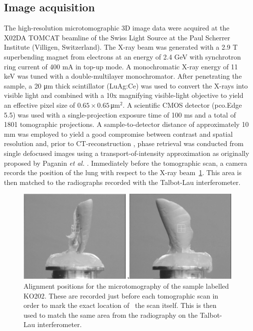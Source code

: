 \documentclass[preprint,12pt]{elsarticle}
\begin{document}
\subsection*{Image acquisition}\label{sec:acquisition}
The high-resolution microtomographic 3D image data were acquired at the X02DA TOMCAT beamline of the Swiss Light Source at the Paul Scherrer Institute (Villigen, Switzerland). The X-ray beam was generated with a 2.9 T superbending magnet from electrons at an energy of 2.4 GeV with synchrotron ring current of 400 mA in top-up mode. A monochromatic X-ray energy of 11 keV was tuned with a double-multilayer monochromator. After penetrating the sample, a 20 μm thick scintillator (LuAg:Ce) was used to convert the X-rays into visible light and combined with a 10x magnifying visible-light objective to yield an effective pixel size of $0.65 \times 0.65\,$μm$^2$. A scientific CMOS detector (pco.Edge 5.5) was used with a single-projection exposure time of 100 ms and a total of 1801 tomographic projections. A sample-to-detector distance of approximately 10 mm was employed to yield a good compromise between contrast and spatial resolution and, prior to CT-reconstruction \cite{Marone2012}, phase retrieval was conducted from single defocused images using a transport-of-intensity approximation as originally proposed by Paganin \textit{et al.} \cite{Paganin2002}. Immediately before the tomographic scan, a camera records the position of the lung with respect to the X-ray beam~\ref{603392}. This area is then matched to the radiographs recorded with the Talbot-Lau interferometer.
\begin{figure}[h!]
\begin{center}
\includegraphics[width=0.70\columnwidth]{figures/Screenshot_20190121_153540/Screenshot_20190121_153540}
\caption{{Alignment positions for the microtomography of the sample labelled
KO202. These are recorded just before each tomographic scan in order to
mark the exact location of~ the scan itself. This is then used to match
the same area from the radiography on the Talbot-Lau interferometer.
{\label{603392}}%
}}
\end{center}
\end{figure}
\end{document}
